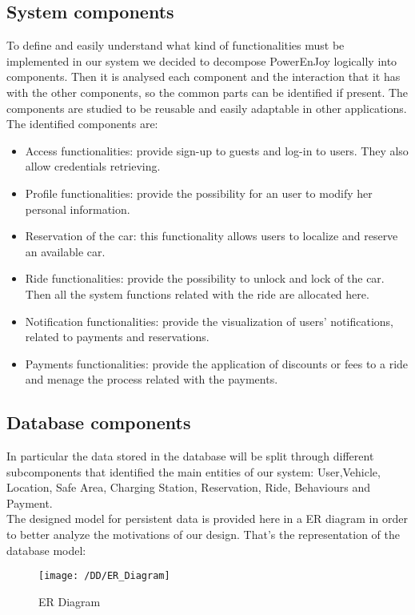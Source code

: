 \subsection{System components}
To define and easily understand what kind of functionalities must be implemented in our system we decided to decompose PowerEnJoy logically into components. Then it is analysed each component and the interaction that it has with the other components, so the common parts can be identified if present. The components are studied to be reusable and easily adaptable in other applications.
\\The identified components are:
\begin{itemize}
	\item Access functionalities: provide sign-up to guests and log-in to users. They also allow credentials retrieving.
	\item Profile functionalities: provide the possibility for an user to modify her personal information.
	\item Reservation of the car: this functionality allows users to localize and reserve an available car.
	\item Ride functionalities: provide the possibility to unlock and lock of the car. Then all the system functions related with the ride are allocated here. %
	\item Notification functionalities: provide the visualization of users' notifications, related to payments and reservations.%
	\item Payments functionalities: provide the application of discounts or fees to a ride and menage the process related with the payments.
\end{itemize}

\subsection{Database components}
In particular the data stored in the database will be split through different subcomponents that identified the main entities of our system:
User,Vehicle, Location, Safe Area, Charging Station, Reservation, Ride, Behaviours and Payment.  
\\The designed model for persistent data is provided here in a ER diagram in order to better analyze the motivations of our design. That's the representation of the database model:
\begin{figure}[!h]
  \centering
  \vspace{0.2cm}
  \texttt{[image: /DD/ER\_Diagram]}\\
  \vspace{0.4cm}
  \caption{ER Diagram} 
  \label{fig:ER_Diagram} 
\end{figure}

